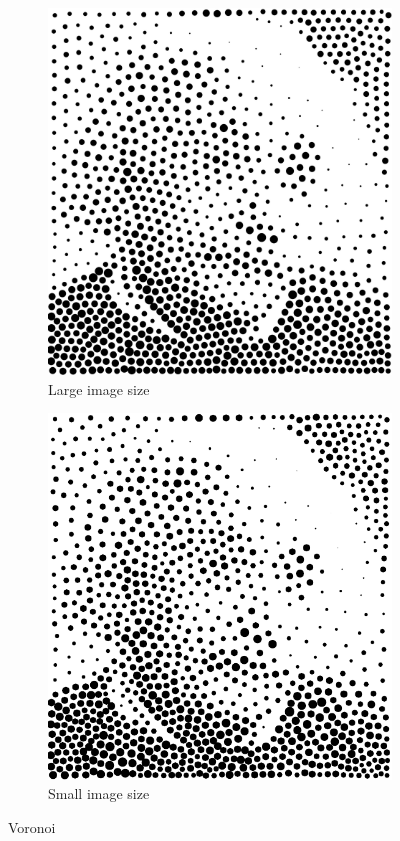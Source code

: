 \documentclass[11pt]{article}
\begin{document}
\begin{enumerate}
\begin{figure}[H]
    \centering
        \begin{subfigure}{0.4\textwidth}
        \centering
        \includegraphics[width=\textwidth]{../results/voronoi/3-5.pdf}
 \caption{Large image size}
    \end{subfigure}
    \begin{subfigure}{0.4\textwidth}
        \centering
        \includegraphics[width=\textwidth]{../results/voronoi/3-6.pdf}
 \caption{Small image size}
    \end{subfigure}
    \caption{Voronoi}
    \label{fig:2}
\end{figure}


\end{enumerate}
\end{document}
